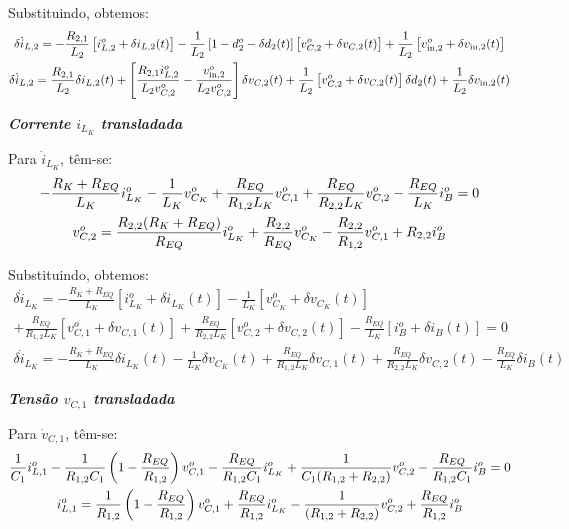 Substituindo, obtemos:
\begin{gather}
  \delta \dot{i}_{L,2} = - \frac{R_{2,1}}{L_2} \left[i_{L,2}^o + \delta i_{L,2}(t)\right] - \frac{1}{L_2} \left[1 - d_2^o - \delta d_2(t)\right] \left[v_{C,2}^o + \delta v_{C,2}(t)\right] + \frac{1}{L_2} \left[v_{\text{in},2}^o + \delta v_{\text{in},2}(t)\right] \nle
  \delta \dot{i}_{L,2} = \frac{R_{2,1}}{L_2} \delta i_{L,2}(t)
  + \left[\frac{R_{2,1} i_{L,2}^o}{L_2 v_{C,2}^o} - \frac{v_{\text{in},2}^o}{L_2 v_{C,2}^o}\right] \delta v_{C,2}(t) + \frac{1}{L_2} \left[v_{C,2}^o + \delta v_{C,2}(t)\right] \delta d_2(t) + \frac{1}{L_2} \delta v_{\text{in},2}(t)
\end{gather}

\textbf{\textit{Corrente $i_{L_K}$ transladada}} \vspace*{12pt}

Para $\dot{i}_{L_K}$, têm-se:
\begin{gather}
  - \frac{R_K + R_{EQ}}{L_K} i_{L_K}^o - \frac{1}{L_K} v_{C_K}^o + \frac{R_{EQ}}{{R_{1,2}}L_K} v_{C,1}^o + \frac{R_{EQ}}{R_{2,2}L_K} v_{C,2}^o - \frac{R_{EQ}}{L_K} i_B^o= 0 \nle
  v_{C,2}^o = \frac{R_{2,2}(R_K + R_{EQ})}{R_{EQ}} i_{L_K}^o + \frac{R_{2,2}}{R_{EQ}} v_{C_K}^o - \frac{R_{2,2}}{{R_{1,2}}} v_{C,1}^o + R_{2,2}i_B^o
\end{gather}

Substituindo, obtemos:
\begin{multline*}
  \delta \dot{i}_{L_K} = - \frac{R_K + R_{EQ}}{L_K} \left[i_{L_K}^o + \delta i_{L_K}(t)\right]
  - \frac{1}{L_K} \left[v_{C_K}^o + \delta v_{C_K}(t)\right] \\
  + \frac{R_{EQ}}{{R_{1,2}}L_K} \left[v_{C,1}^o + \delta v_{C,1}(t)\right]
  + \frac{R_{EQ}}{R_{2,2}L_K} \left[v_{C,2}^o + \delta v_{C,2}(t)\right] - \frac{R_{EQ}}{L_K} \left[i_B^o + \delta i_B(t)\right] = 0
\end{multline*}
\begin{gather}
  \delta \dot{i}_{L_K} = - \frac{R_K + R_{EQ}}{L_K} \delta i_{L_K}(t)
  - \frac{1}{L_K} \delta v_{C_K}(t)
  + \frac{R_{EQ}}{{R_{1,2}}L_K} \delta v_{C,1}(t)
  + \frac{R_{EQ}}{R_{2,2}L_K} \delta v_{C,2}(t)
  - \frac{R_{EQ}}{L_K} \delta i_B(t)
\end{gather}

\textbf{\textit{Tensão $v_{C,1}$ transladada}} \vspace*{12pt}

Para $\dot{v}_{C,1}$, têm-se:
\begin{gather}
  \frac{1}{C_1} i_{L,1}^o - \frac{1}{R_{1,2}C_1} \left(1 - \frac{R_{EQ}}{{R_{1,2}}}\right) v_{C,1}^o - \frac{R_{EQ}}{R_{1,2} C_1} i_{L_K}^o + \frac{1}{C_1 (R_{1,2} + R_{2,2})} v_{C,2}^o - \frac{R_{EQ}}{R_{1,2}C_1} i_B^o = 0 \nle
  i_{L,1}^o = \frac{1}{R_{1,2}} \left(1 - \frac{R_{EQ}}{{R_{1,2}}}\right) v_{C,1}^o + \frac{R_{EQ}}{R_{1,2} } i_{L_K}^o - \frac{1}{ (R_{1,2} + R_{2,2})} v_{C,2}^o + \frac{R_{EQ}}{R_{1,2}} i_B^o
\end{gather}

